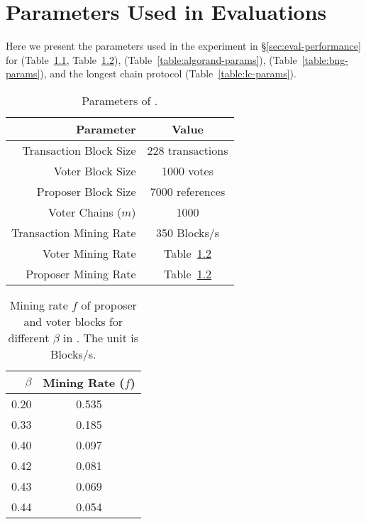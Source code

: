 \chapter{Parameters Used in Evaluations}
\label{apx:datapoints}

Here we present the parameters used in the experiment in \S\ref{sec:eval-performance} for \prism (Table~\ref{table:prism-params}, Table~\ref{table:prism-beta}), \algorand (Table~\ref{table:algorand-params}), \bng (Table~\ref{table:bng-params}), and the longest chain protocol (Table~\ref{table:lc-params}).

\begin{table}[t]
	\centering
	\caption{Parameters of \prism.}
	\begin{tabular}{ r | c } 
	 \hline
	 Parameter & Value \\ [0.5ex] 
	 \hline\hline
	 Transaction Block Size & 228 transactions \\
	 Voter Block Size & 1000 votes \\
	 Proposer Block Size & 7000 references \\
	 Voter Chains ($m$) & 1000 \\
	 Transaction Mining Rate & 350 Blocks/s \\
	 Voter Mining Rate & Table~\ref{table:prism-beta}\\
	 Proposer Mining Rate & Table~\ref{table:prism-beta}\\
	 \hline
	\end{tabular}
\label{table:prism-params}
\end{table}

\begin{table}[t]
	\centering
	\caption{Mining rate $f$ of proposer and voter blocks for different $\beta$ in \prism. The unit is Blocks/s.}
	\begin{tabular}{ r | c } 
	 \hline
	 $\beta$ & Mining Rate ($f$) \\ [0.5ex] 
	 \hline\hline
	 0.20 & 0.535 \\
	 0.33 & 0.185 \\
	 0.40 & 0.097 \\
	 0.42 & 0.081 \\
	 0.43 & 0.069 \\
	 0.44 & 0.054 \\
	 \hline
	\end{tabular}
\label{table:prism-beta}
\end{table}


